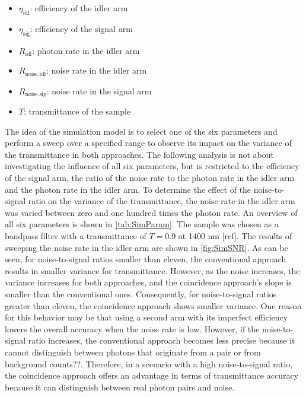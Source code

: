 \begin{itemize}[topsep=0pt, partopsep=0pt, itemsep=1.5pt, parsep=0pt, leftmargin=3em]
	\item $\eta_{\text{idl}}$: efficiency of the idler arm
	\item $\eta_{\text{sig}}$: efficiency of the signal arm
	\item $R_{\text{idl}}$: photon rate in the idler arm
	\item $R_{\text{noise,idl}}$: noise rate in the idler arm
	\item $R_{\text{noise,sig}}$: noise rate in the signal arm
	\item $T$: transmittance of the sample 
\end{itemize}
The idea of the simulation model is to select one of the six parameters and perform a sweep over a specified range to observe its impact on the variance of the transmittance in both approaches. The following analysis is not about investigating the influence of all six parameters, but is restricted to the efficiency of the signal arm, the ratio of the noise rate to the photon rate in the idler arm and the photon rate in the idler arm.
To determine the effect of the noise-to-signal ratio on the variance of the transmittance, the noise rate in the idler arm was varied between zero and one hundred times the photon rate. An overview of all six parameters is shown in \autoref{tab:SimParam}. The sample was chosen as a bandpass filter with a transmittance of $T=0.9$ at 1400 nm [ref].\newline
The results of sweeping the noise rate in the idler arm are shown in \autoref{fig:SimSNR}. As can be seen, for noise-to-signal ratios smaller than eleven, the conventional approach results in smaller variance for transmittance. However, as the noise increases, the variance increases for both approaches, and the coincidence approach's slope is smaller than the conventional ones. Consequently, for noise-to-signal ratios greater than eleven, the coincidence approach shows smaller variance. One reason for this behavior may be that using a second arm with its imperfect efficiency lowers the overall accuracy when the noise rate is low. However, if the noise-to-signal ratio increases, the conventional approach becomes less precise because it cannot distinguish between photons that originate from a pair or from background counts??. Therefore, in a scenario with a high noise-to-signal ratio, the coincidence approach offers an advantage in terms of transmittance accuracy because it can distinguish between real photon pairs and noise.
